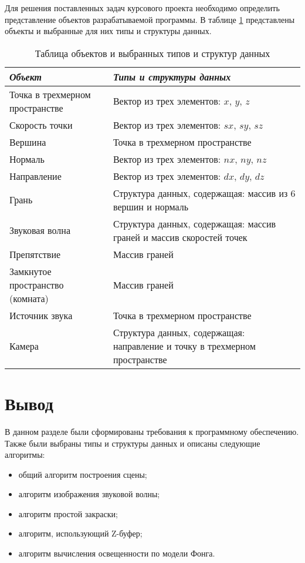 Для решения поставленных задач курсового проекта необходимо определить представление объектов разрабатываемой программы.
В таблице \ref{table:types} представлены объекты и выбранные для них типы и структуры данных.
\begin{table}[h!]
	\begin{center}
		\caption{\label{table:types} Таблица объектов и выбранных типов и структур данных}
		\begin{tabular}{|p{230pt}|p{230pt}|}
			\hline
			\textit{Объект} &\textit{Типы и структуры данных} \\ \hline
			Точка в трехмерном пространстве & Вектор из трех элементов: $x$, $y$, $z$ \\ \hline
			Скорость точки & Вектор из трех элементов: $sx$, $sy$, $sz$ \\ \hline
			Вершина & Точка в трехмерном пространстве \\ \hline
			Нормаль & Вектор из трех элементов: $nx$, $ny$, $nz$ \\ \hline
			Направление & Вектор из трех элементов: $dx$, $dy$, $dz$ \\ \hline
			Грань & Структура данных, содержащая: массив из 6 вершин и нормаль \\ \hline
			Звуковая волна & Структура данных, содержащая: массив граней и массив скоростей точек \\ \hline
			Препятствие & Массив граней \\ \hline
			Замкнутое пространство (комната) & Массив граней \\ \hline
			Источник звука & Точка в трехмерном пространстве \\ \hline
			Камера & Структура данных, содержащая: направление и точку в трехмерном пространстве \\ \hline
		\end{tabular}
	\end{center}
\end{table}

\section{Вывод}

В данном разделе были сформированы требования к программному обеспечению.
Также были выбраны типы и структуры данных и описаны следующие алгоритмы:
\begin{itemize}
	\item общий алгоритм построения сцены;
	\item алгоритм изображения звуковой волны;
	\item алгоритм простой закраски;
	\item алгоритм, использующий Z-буфер;
	\item алгоритм вычисления освещенности по модели Фонга.
\end{itemize}
